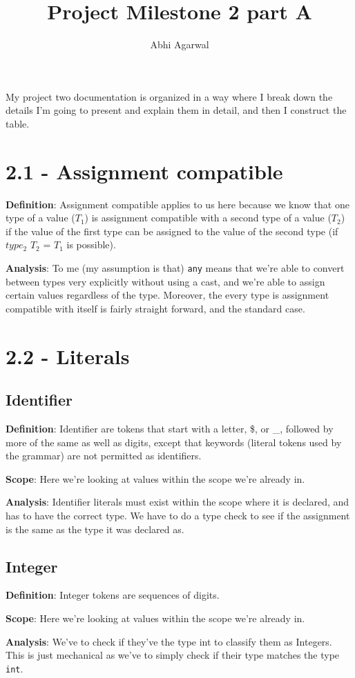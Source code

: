 \documentclass[11pt, oneside]{article}
\title{Project Milestone 2 part A}
\author{Abhi Agarwal}
\date{}
\begin{document}
\maketitle

\par My project two documentation is organized in a way where I break down the details I'm going to present and explain them in detail, and then I construct the table.

\section*{2.1 - Assignment compatible}
\par \textbf{Definition}: Assignment compatible applies to us here because we know that one type of a value ($T_1$) is assignment compatible with a second type of a value ($T_2$) if the value of the first type can be assigned to the value of the second type (if $type_2$ $T_2$ = $T_1$ is possible). 
\par \textbf{Analysis}: To me (my assumption is that) \texttt{any} means that we're able to convert between types very explicitly without using a cast, and we're able to assign certain values regardless of the type. Moreover, the every type is assignment compatible with itself is fairly straight forward, and the standard case. 

\section*{2.2 - Literals}
\subsection*{Identifier}
\par \textbf{Definition}: Identifier are tokens that start with a letter, \$, or \_, followed by more of the same as well as digits, except that keywords (literal tokens used by the grammar) are not permitted as identifiers. 
\par \textbf{Scope}: Here we're looking at values within the scope we're already in.
\par \textbf{Analysis}: Identifier literals must exist within the scope where it is declared, and has to have the correct type. We have to do a type check to see if the assignment is the same as the type it was declared as.

\subsection*{Integer}
\par \textbf{Definition}: Integer tokens are sequences of digits.
\par \textbf{Scope}: Here we're looking at values within the scope we're already in.
\par \textbf{Analysis}: We've to check if they've the type int to classify them as Integers. This is just mechanical as we've to simply check if their type matches the type \texttt{int}.
\end{document}
